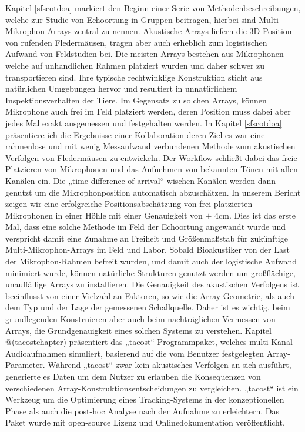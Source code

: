 \documentclass[
]{book}
\begin{document}
Kapitel \ref{sfscotdoa} markiert den Beginn einer Serie von Methodenbeschreibungen, welche zur Studie von Echoortung in Gruppen beitragen, hierbei sind Multi-Mikrophon-Arrays zentral zu nennen. Akustische Arrays liefern die 3D-Position von rufenden Fledermäusen, tragen aber auch erheblich zum logistischen Aufwand von Feldstudien bei. Die meisten Arrays bestehen aus Mikrophonen welche auf unhandlichen Rahmen platziert wurden und daher schwer zu transportieren sind. Ihre typische rechtwinklige Konstruktion sticht aus natürlichen Umgebungen hervor und resultiert in unnatürlichem Inspektionsverhalten der Tiere. Im Gegensatz zu solchen Arrays, können Mikrophone auch frei im Feld platziert werden, deren Position muss dabei aber jedes Mal exakt ausgemessen und festgehalten werden. In Kapitel \ref{sfscotdoa} präsentiere ich die Ergebnisse einer Kollaboration deren Ziel es war eine rahmenlose und mit wenig Messaufwand verbundenen Methode zum akustischen Verfolgen von Fledermäusen zu entwickeln. Der Workflow schließt dabei das freie Platzieren von Mikrophonen und das Aufnehmen von bekannten Tönen mit allen Kanälen ein. Die „time-difference-of-arrival`` wischen Kanälen werden dann genutzt um die Mikrophonposition automatisch abzuschätzen. In unserem Bericht zeigen wir eine erfolgreiche Positionsabschätzung von frei platzierten Mikrophonen in einer Höhle mit einer Genauigkeit von \(\pm\) 4cm. Dies ist das erste Mal, dass eine solche Methode im Feld der Echoortung angewandt wurde und verspricht damit eine Zunahme an Freiheit und Größenmaßstab für zukünftige Multi-Mikrophon-Arrays im Feld und Labor. Sobald Bioakustiker von der Last der Mikrophon-Rahmen befreit wurden, und damit auch der logistische Aufwand minimiert wurde, können natürliche Strukturen genutzt werden um großflächige, unauffällige Arrays zu installieren.
Die Genauigkeit des akustischen Verfolgens ist beeinflusst von einer Vielzahl an Faktoren, so wie die Array-Geometrie, als auch dem Typ und der Lage der gemessenen Schallquelle. Daher ist es wichtig, beim grundlegenden Konstruieren aber auch beim nachträglichen Vermessen von Arrays, die Grundgenauigkeit eines solchen Systems zu verstehen. Kapitel @(tacostchapter) präsentiert das „tacost`` Programmpaket, welches multi-Kanal-Audioaufnahmen simuliert, basierend auf die vom Benutzer festgelegten Array-Parameter. Während „tacost`` zwar kein akustisches Verfolgen an sich ausführt, generierte es Daten um dem Nutzer zu erlauben die Konsequenzen von verschiedenen Array-Konstruktionsentscheidungen zu vergleichen. „tacost`` ist ein Werkzeug um die Optimierung eines Tracking-Systems in der konzeptionellen Phase als auch die post-hoc Analyse nach der Aufnahme zu erleichtern. Das Paket wurde mit open-source Lizenz und Onlinedokumentation veröffentlicht.
\end{document}
